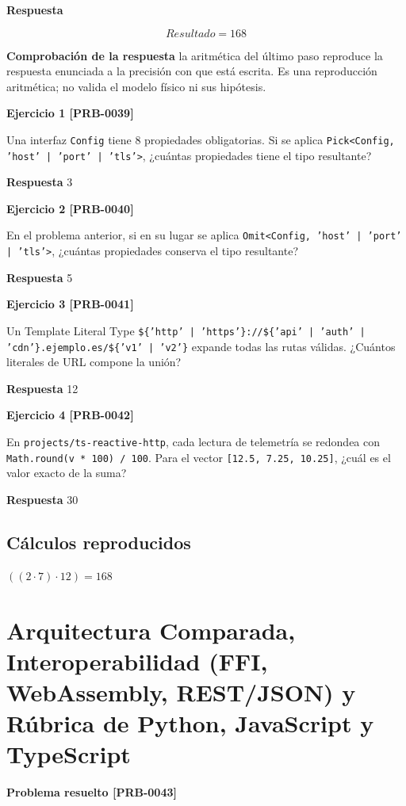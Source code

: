 \documentclass{book}
\begin{document}
\noindent\textbf{Respuesta}

\[
Resultado = 168
\]

\noindent\textbf{Comprobación de la respuesta} la aritmética del último paso reproduce la respuesta enunciada a la precisión con que está escrita. Es una reproducción aritmética; no valida el modelo físico ni sus hipótesis.

\noindent\textbf{Ejercicio 1 [PRB-0039]}

Una interfaz \texttt{Config} tiene 8 propiedades obligatorias. Si se aplica \texttt{Pick<Config, 'host' | 'port' | 'tls'>}, ¿cuántas propiedades tiene el tipo resultante?

\noindent\textbf{Respuesta} 3

\noindent\textbf{Ejercicio 2 [PRB-0040]}

En el problema anterior, si en su lugar se aplica \texttt{Omit<Config, 'host' | 'port' | 'tls'>}, ¿cuántas propiedades conserva el tipo resultante?

\noindent\textbf{Respuesta} 5

\noindent\textbf{Ejercicio 3 [PRB-0041]}

Un Template Literal Type \texttt{\$\{'http' | 'https'\}://\$\{'api' | 'auth' | 'cdn'\}.ejemplo.es/\$\{'v1' | 'v2'\}} expande todas las rutas válidas. ¿Cuántos literales de URL compone la unión?

\noindent\textbf{Respuesta} 12

\noindent\textbf{Ejercicio 4 [PRB-0042]}

En \texttt{projects/ts-reactive-http}, cada lectura de telemetría se redondea con \texttt{Math.round(v * 100) / 100}. Para el vector \texttt{[12.5, 7.25, 10.25]}, ¿cuál es el valor exacto de la suma?

\noindent\textbf{Respuesta} 30

\subsection*{Cálculos reproducidos}

\(\left(\left(2\cdot 7\right)\cdot 12\right) = 168\)

\section{Arquitectura Comparada, Interoperabilidad (FFI, WebAssembly, REST/JSON) y Rúbrica de Python, JavaScript y TypeScript}

\noindent\textbf{Problema resuelto [PRB-0043]}
\end{document}
